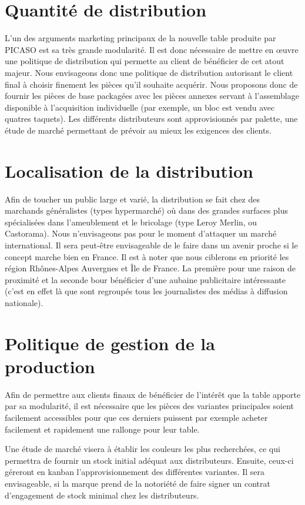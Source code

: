 \section{Quantité de distribution}
L'un des arguments marketing principaux de la nouvelle table 
produite par PICASO est sa très grande modularité. Il est donc
nécessaire de mettre en \oe uvre une politique de distribution qui
permette au client de bénéficier de cet atout majeur. Nous envisageons
donc une politique de distribution autorisant le client final à choisir
finement les pièces qu'il souhaite acquérir. Nous proposons donc de
fournir les pièces de base packagées avec les pièces annexes servant à
l'assemblage disponible à l'acquisition individuelle (par exemple, un
bloc est vendu avec quatres taquets). Les différents distributeurs 
sont approvisionnés par palette, une étude de marché permettant de
prévoir au mieux les exigences des clients.

\section{Localisation de la distribution}
Afin de toucher un public large et varié, la distribution se fait chez des
marchands généralistes (types hypermarché) où dans des grandes surfaces
plus spécialisées dans l'ameublement et le bricolage (type Leroy Merlin,
ou Castorama). Nous n'envisageons pas pour le moment d'attaquer un
marché international. Il sera peut-être envisageable de le faire dans un
avenir proche si le concept marche bien en France. Il est à noter que
nous ciblerons en priorité les région Rhônes-Alpes Auvergnes et Île de
France. La première pour une raison de proximité et la seconde bour
bénéficier d'une aubaine publicitaire intéressante (c'est en effet là
que sont regroupés tous les journalistes des médias à diffusion
nationale).

\section{Politique de gestion de la production}
Afin de permettre aux clients finaux de bénéficier de l'intérêt que la
table apporte par sa modularité, il est nécessaire que les pièces des
variantes principales soient facilement accessibles pour que ces
derniers puissent par exemple acheter facilement et rapidement une
rallonge pour leur table.

Une étude de marché visera à établir les couleurs les plus recherchées,
ce qui permettra de fournir un stock initial adéquat aux distributeurs.
Ensuite, ceux-ci géreront en kanban l'approvisionnement des différentes
variantes. Il sera envisageable, si la marque prend de la notoriété de
faire signer un contrat d'engagement de stock minimal chez les
distributeurs.
